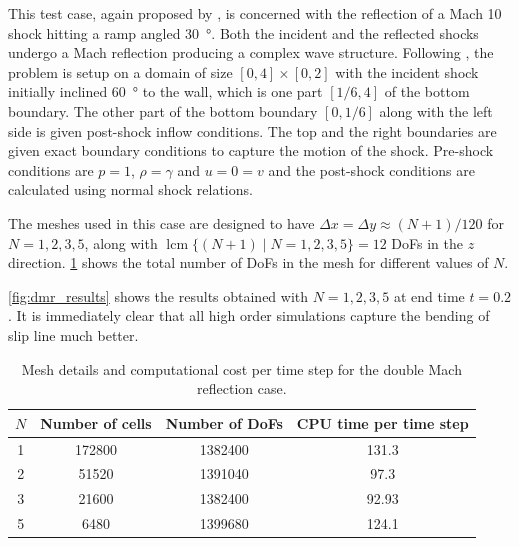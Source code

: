 \documentclass[a4paper,11pt,oneside]{article}
\newcommand{\citear}[1]{\citeauthor{#1} \cite{#1}} %
\DeclareMathOperator{\lcm}{lcm} %
\begin{document}
This test case, again proposed by \citear{woodwardColella1984}, is concerned with the reflection of a Mach 10 shock hitting a ramp angled \SI{30}{\degree}. Both the incident and the reflected shocks undergo a Mach reflection producing a complex wave structure. Following \citear{kemm2016}, the problem is setup on a domain of size $[0,4] \times [0,2]$ with the incident shock initially inclined \SI{60}{\degree} to the wall, which is one part $[1/6,4]$ of the bottom boundary. The other part of the bottom boundary $[0,1/6]$ along with the left side is given post-shock inflow conditions. The top and the right boundaries are given exact boundary conditions to capture the motion of the shock. Pre-shock conditions are $p=1$, $\rho=\gamma$ and $u=0=v$ and the post-shock conditions are calculated using normal shock relations.

The meshes used in this case are designed to have $\Delta x = \Delta y \approx (N+1)/120$ for $N=1,2,3,5$, along with $\lcm \{ (N+1) \mid N=1,2,3,5 \} = 12$ DoFs in the $z$ direction. \cref{tab:dmr_mesh_cpu} shows the total number of DoFs in the mesh for different values of $N$.

\cref{fig:dmr_results} shows the results obtained with $N=1,2,3,5$ at end time $t=0.2$. It is immediately clear that all high order simulations capture the bending of slip line much better.

\begin{table}[htbp]
    \centering
    \caption{Mesh details and computational cost per time step for the double Mach reflection case.}
    \label{tab:dmr_mesh_cpu}
    \begin{tabular}{cccc}
        \toprule
        $N$ & Number of cells & Number of DoFs & CPU time per time step \\
        \midrule
        1 & 172800 & 1382400 & 131.3 \\
        2 & 51520 & 1391040 & 97.3 \\
        3 & 21600 & 1382400 & 92.93 \\
        5 & 6480 & 1399680 & 124.1 \\
        \bottomrule
    \end{tabular}
\end{table}
\end{document}
